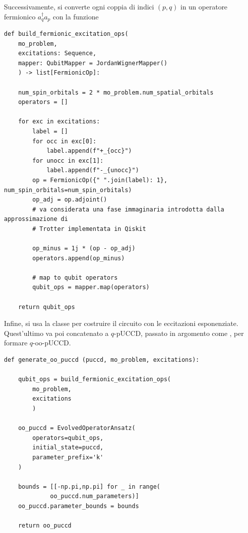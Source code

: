 Successivamente, si converte ogni coppia di indici $(p,q)$ in un operatore fermionico $a^{\dagger}_{q} a_p$ con la funzione 
    
\begin{tcolorbox}[title=Costruzione operatore fermionico, breakable]
\begin{lstlisting}
def build_fermionic_excitation_ops(
    mo_problem, 
    excitations: Sequence,
    mapper: QubitMapper = JordanWignerMapper()
    ) -> list[FermionicOp]:
    
    num_spin_orbitals = 2 * mo_problem.num_spatial_orbitals
    operators = []

    for exc in excitations:
        label = []
        for occ in exc[0]:
            label.append(f"+_{occ}")
        for unocc in exc[1]:
            label.append(f"-_{unocc}")
        op = FermionicOp({" ".join(label): 1}, num_spin_orbitals=num_spin_orbitals)
        op_adj = op.adjoint()
        # va considerata una fase immaginaria introdotta dalla approssimazione di 
        # Trotter implementata in Qiskit

        op_minus = 1j * (op - op_adj)
        operators.append(op_minus)
        
        # map to qubit operators
        qubit_ops = mapper.map(operators)

    return qubit_ops
\end{lstlisting}
\vspace{-0.2cm}
\end{tcolorbox}

Infine, si usa la classe  per costruire il circuito con le eccitazioni esponenziate. Quest'ultimo va poi concatenato a $q$-pUCCD, passato in argomento come , per formare $q$-oo-pUCCD.

\begin{tcolorbox}[title=Generazione ansatz oo-pUCCD, breakable]
\begin{lstlisting}
def generate_oo_puccd (puccd, mo_problem, excitations):

    qubit_ops = build_fermionic_excitation_ops(
        mo_problem, 
        excitations
        )

    oo_puccd = EvolvedOperatorAnsatz(
        operators=qubit_ops,
        initial_state=puccd,
        parameter_prefix='k'
    )

    bounds = [[-np.pi,np.pi] for _ in range(
             oo_puccd.num_parameters)]
    oo_puccd.parameter_bounds = bounds

    return oo_puccd
\end{lstlisting}
\vspace{-0.2cm}
\end{tcolorbox}


